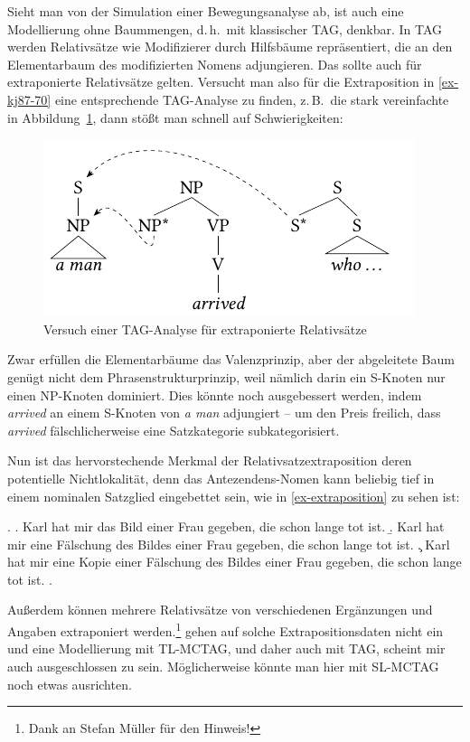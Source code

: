 Sieht man von der Simulation einer Bewegungsanalyse ab, ist auch eine Modellierung ohne Baummengen, d.\,h.\ mit klassischer TAG, denkbar. In TAG werden Relativsätze wie Modifizierer durch Hilfsbäume repräsentiert, die an den Elementarbaum des modifizierten Nomens adjungieren. Das sollte auch für extraponierte Relativsätze gelten. Versucht man also für die Extraposition in \ref{ex-kj87-70} eine entsprechende TAG-Analyse zu finden, z.\,B.\ die stark vereinfachte in Abbildung~\ref{fig-extraposition-1}, dann stö\ss t man schnell auf Schwierigkeiten:\largerpage%
\begin{figure}[t]
\centering
\includegraphics{graphics/abb518.pdf}
\caption{\label{fig-extraposition-1}Versuch einer TAG-Analyse für extraponierte Relativsätze}
\end{figure}
Zwar erfüllen die Elementarbäume das Valenzprinzip, aber der abgeleitete Baum genügt nicht dem Phrasenstrukturprinzip, weil nämlich darin ein S-Knoten nur einen NP-Knoten dominiert. Dies könnte noch ausgebessert werden, indem {\it arrived} an einem S-Knoten von {\it a man} adjungiert -- um den Preis freilich, dass {\it arrived} fälschlicherweise eine Satzkategorie subkategorisiert. 

\newpage
Nun ist das hervorstechende Merkmal der Relativsatzextraposition deren potentielle Nichtlokalität, denn das Antezendens-Nomen kann beliebig tief in einem nominalen Satzglied eingebettet sein, wie in \ref{ex-extraposition} zu sehen ist:

\ex. \label{ex-extraposition}
\a. Karl hat mir das Bild einer Frau gegeben, die schon lange tot ist.
\b. Karl hat mir eine Fälschung des Bildes einer Frau gegeben, die schon lange tot ist.
\c. Karl hat mir eine Kopie einer Fälschung des Bildes einer Frau gegeben, die schon lange tot ist.
\z. \citep[(13.18)]{Mueller:99}

Au\ss erdem können mehrere Relativsätze von verschiedenen Ergänzungen und Angaben extraponiert werden.\footnote{Dank an Stefan Müller für den Hinweis!} \cite{Kroch:Joshi:87} gehen auf solche Extrapositionsdaten nicht ein und eine Modellierung mit TL-MCTAG, und daher auch mit TAG, scheint mir auch ausgeschlossen zu sein. Möglicherweise könnte man hier mit SL-MCTAG noch etwas ausrichten. %


